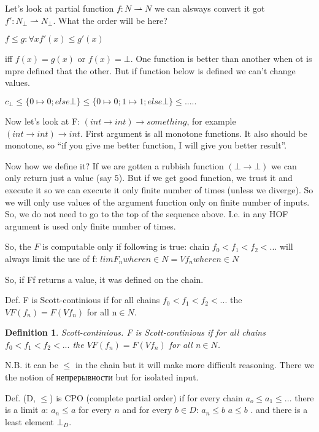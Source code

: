 \documentclass[a4paper,10pt]{book}
\newtheorem{definition}{Definition}
\newcommand{\rarr}{ \rightarrow }
\begin{document}
Let's look at partial function $f: N \rightharpoonup N$ we can alsways convert it got 
$f': N_\bot \rightharpoonup N_\bot$. What the order will be here?


$ f \leq g: \forall x f'(x) \leq g'(x)$

iff $f(x) = g(x)$ or $f(x)=\bot$. One function is better than another when ot is mpre defined that
the other. But if function below is defined we can't change values.

$c_\bot \leq \{0\mapsto 0; else \bot\}
        \leq \{0\mapsto 0; 1\mapsto 1; else \bot\}
        \leq .....
        $
        
Now let's look at F: $(int \rarr int) \rarr something$, for example        
$(int \rarr int) \rarr int$. First argument is all monotone functions. It also should be monotone,
so ``if you give me better function, I will give you better result''.

Now how we define it? If we are gotten a rubbish function $(\bot \rarr\bot)$ we can only return 
just a value (say $5$). But if we get good function, we trust it and execute it so
we can execute it only finite number of times (unless we diverge). So we will only use values of the 
argument function only on finite number of inputs.  So, we do not need to go to the top of the 
sequence above. I.e. in any HOF argument is used only finite number of times.
        
So, the $F$ is computable only if following is true:
chain $f_0 < f_1 < f_2 < ...$ will always limit the use of f: 
$lim F_n where n\in N = V f_n where n\in N$


So, if Ff returns a value, it was defined on the chain.

Def. F is Scott-continious if for all chains  $f_0 < f_1 < f_2 < ...$
the $V F(f_n) = F(Vf_n)$ for all n$\in N$.
\begin{definition}{Scott-continious.}
F is Scott-continious if for all chains  $f_0 < f_1 < f_2 < ...$
the $V F(f_n) = F(Vf_n)$ for all n$\in N$.
\end{definition}
N.B. it can be $\leq$ in the chain but it will make more difficult reasoning. There we
the notion of непрерывности but for isolated input.

Def. (D, $\leq$) is CPO (complete partial order) if for every chain $a_o \leq a_1 \leq ...$
there is a limit $a$: $a_n\leq a$ for every $n$ and for every $b\in D$: $a_n\leq b$ $a\leq b$ .
and there is a least element $\bot_D$.
\end{document}
